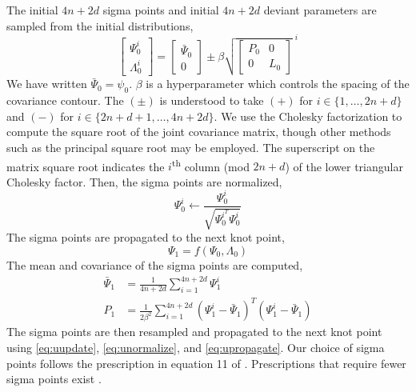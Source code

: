 The initial $4n + 2d$ sigma points and initial $4n + 2d$ deviant parameters are sampled
from the initial distributions,
\begin{equation}\label{eq:uupdate}
  \begin{bmatrix} \Psi_{0}^{i} \\ \Lambda_{0}^{i} \end{bmatrix} =
  \begin{bmatrix} \bar{\Psi}_{0} \\ 0\end{bmatrix}
    \pm \beta \sqrt{\begin{bmatrix} P_{0} & 0\\ 0 & L_{0}\end{bmatrix}}^{\; i}
\end{equation}
We have written $\bar{\Psi}_{0} = \psi_{0}$. $\beta$
is a hyperparameter which controls the spacing of the covariance contour.
The $(\pm)$ is understood to take $(+)$ for $ i \in \{1, \dots, 2n + d\}$ and $(-)$ for
$i \in \{2n + d + 1, \dots, 4n + 2d\}$. We use the Cholesky factorization
to compute the square root of the
joint covariance matrix, though other methods
such as the principal square root may be employed.
The superscript on the matrix square root indicates the $i$\textsuperscript{th}
column (mod $2n + d$) of the lower triangular Cholesky factor.
Then, the sigma points are normalized,
\begin{equation}\label{eq:unormalize}
  \Psi_{0}^{i} \gets \frac{\Psi_{0}^{i}}{\sqrt{\Psi_{0}^{i^{T}} \Psi_{0}^{i}}}
\end{equation}
The sigma points are propagated to the next knot point,
\begin{equation}\label{eq:upropagate}
  \Psi_{1} = f(\Psi_{0}, \Lambda_{0})
\end{equation}
The mean and covariance of the sigma points are computed,
\begin{align}
  \bar{\Psi}_{1} &= \frac{1}{4n + 2d} \sum_{i = 1}^{4n + 2d} \Psi_{1}^{i}\\
  P_{1} &= \frac{1}{2 \beta^{2}} \sum_{i = 1}^{4n + 2d}
  (\Psi^{i}_{1} - \bar{\Psi}_{1})^{T}(\Psi^{i}_{1} - \bar{\Psi}_{1})
\end{align}
The sigma points are then resampled and propagated to the next knot point using
\eqref{eq:uupdate}, \eqref{eq:unormalize}, and \eqref{eq:upropagate}. Our
choice of sigma points follows the prescription in equation 11 of \cite{julier2004unscented}.
Prescriptions that require fewer sigma points exist \cite{julier2002reduced}.




